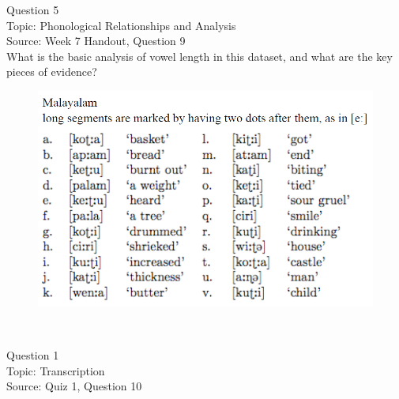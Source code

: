 \documentclass[12pt]{article}
\begin{document}
\newpage

{\large Question 5}\\

Topic: Phonological Relationships and Analysis\\
Source: Week 7 Handout, Question 9\\

What is the basic analysis of vowel length in this dataset, and what are the key pieces of evidence?\\

\begin{figure}[H]
\includegraphics{../images/malayalam.png}
\end{figure}

\newpage

\begin{center}
\textbf{{\color{red}{\HUGE END OF EXAM}}}\\

\end{center}
\newpage

\begin{center}
\textbf{{\color{blue}{\HUGE START OF EXAM\\}}}

\textbf{{\color{blue}{\HUGE Student ID: 94988\\}}}

\textbf{{\color{blue}{\HUGE \\}}}

\end{center}
\newpage

{\large Question 1}\\

Topic: Transcription\\
Source: Quiz 1, Question 10\\
\end{document}
